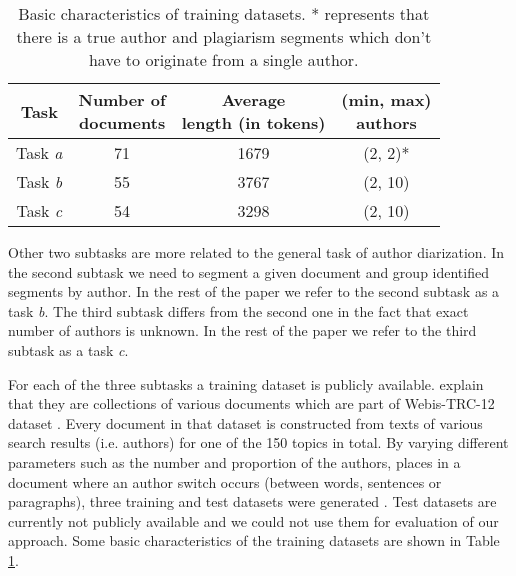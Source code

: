 \documentclass[10pt, a4paper]{article}
\begin{document}
\begin{table}
	\caption{Basic characteristics of training datasets. * represents that there is a true author and plagiarism segments which don't have to originate from a single author.}
	\label{tab:dataset-characteristics}
	\begin{center}
		\begin{tabular}{cccc}
			\toprule
			Task & \thead{Number of \\ documents} & \thead{Average \\ length (in tokens)} & \thead{(min, max)\\authors} \\
			\midrule
			Task \emph{a} & 71 & 1679 & (2, 2)*\\
			Task \emph{b} & 55 & 3767 & (2, 10)\\
			Task \emph{c} & 54 & 3298 & (2, 10)\\
			\bottomrule
		\end{tabular}
	\end{center}
\end{table}

Other two subtasks are more related to the general task of author diarization. In the second subtask we need to segment a given document and group identified segments by author. In the rest of the paper we refer to the second subtask as a task \emph{b}. The third subtask differs from the second one in the fact that exact number of authors is unknown. In the rest of the paper we refer to the third subtask as a task \emph{c}.

For each of the three subtasks a training dataset is publicly available\footnotemark[1]. \citet{rosso-2016} explain that they are collections of various documents which are part of Webis-TRC-12 dataset \citep{potthast-2013}. Every document in that dataset is constructed from texts of various search results (i.e. authors) for one of the 150 topics in total. By varying different parameters such as the number and proportion of the authors, places in a document where an author switch occurs (between words, sentences or paragraphs), three training and test datasets were generated \citep{rosso-2016}. Test datasets are currently not publicly available and we could not use them for evaluation of our approach. Some basic characteristics of the training datasets are shown in Table \ref{tab:dataset-characteristics}.

\end{document}
